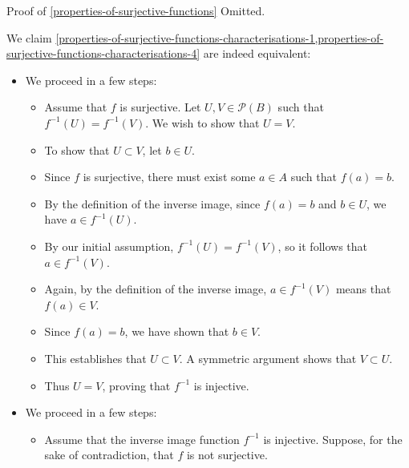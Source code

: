 \begin{Proof}{Proof of \cref{properties-of-surjective-functions}}
    Omitted.

    We claim \cref{properties-of-surjective-functions-characterisations-1,properties-of-surjective-functions-characterisations-4} are indeed equivalent:
    \begin{itemize}
        \item{}We proceed in a few steps:
            \begin{itemize}
                \item Assume that $f$ is surjective. Let $U,V\in\mathcal{P}(B)$ such that $f^{-1}(U)=f^{-1}(V)$. We wish to show that $U=V$.
                \item To show that $U\subset V$, let $b\in U$.
                \item Since $f$ is surjective, there must exist some $a\in A$ such that $f(a)=b$.
                \item By the definition of the inverse image, since $f(a)=b$ and $b\in U$, we have $a\in f^{-1}(U)$.
                \item By our initial assumption, $f^{-1}(U)=f^{-1}(V)$, so it follows that $a\in f^{-1}(V)$.
                \item Again, by the definition of the inverse image, $a\in f^{-1}(V)$ means that $f(a)\in V$.
                \item Since $f(a)=b$, we have shown that $b\in V$.
                \item This establishes that $U\subset V$. A symmetric argument shows that $V\subset U$.
                \item Thus $U=V$, proving that $f^{-1}$ is injective.
            \end{itemize}
        \item{}We proceed in a few steps:
            \begin{itemize}
                \item Assume that the inverse image function $f^{-1}$ is injective. Suppose, for the sake of contradiction, that $f$ is not surjective.

\end{itemize}
\end{itemize}
\end{Proof}
